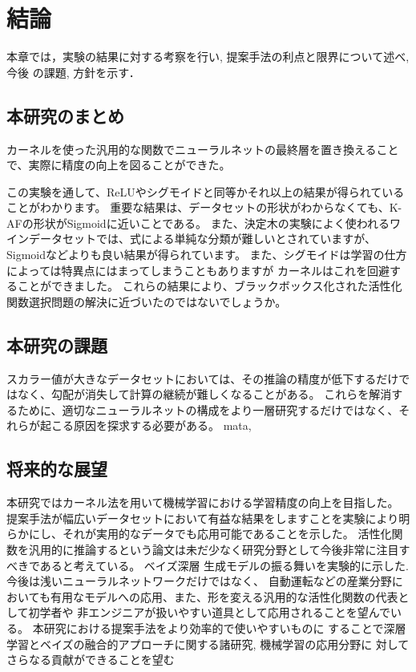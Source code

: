 \chapter{結論}
\label{conclusion}

本章では，実験の結果に対する考察を行い, 提案手法の利点と限界について述べ, 今後
の課題, 方針を示す．


\section{本研究のまとめ}

カーネルを使った汎用的な関数でニューラルネットの最終層を置き換えることで、実際に精度の向上を図ることができた。

 この実験を通して、ReLUやシグモイドと同等かそれ以上の結果が得られていることがわかります。
 重要な結果は、データセットの形状がわからなくても、K-AFの形状がSigmoidに近いことである。 
 また、決定木の実験によく使われるワインデータセットでは、式による単純な分類が難しいとされていますが、Sigmoidなどよりも良い結果が得られています。
 また、シグモイドは学習の仕方によっては特異点にはまってしまうこともありますが カーネルはこれを回避することができました。
 これらの結果により、ブラックボックス化された活性化関数選択問題の解決に近づいたのではないでしょうか。

\section{本研究の課題}
スカラー値が大きなデータセットにおいては、その推論の精度が低下するだけではなく、勾配が消失して計算の継続が難しくなることがある。
これらを解消するために、適切なニューラルネットの構成をより一層研究するだけではなく、それらが起こる原因を探求する必要がある。
mata,



\section{将来的な展望}


本研究ではカーネル法を用いて機械学習における学習精度の向上を目指した。
提案手法が幅広いデータセットにおいて有益な結果をしますことを実験により明らかにし、それが実用的なデータでも応用可能であることを示した。
活性化関数を汎用的に推論するという論文は未だ少なく研究分野として今後非常に注目すべきであると考えている。 ベイズ深層
生成モデルの振る舞いを実験的に示した. 今後は浅いニューラルネットワークだけではなく、
自動運転などの産業分野においても有用なモデルへの応用、また、形を変える汎用的な活性化関数の代表として初学者や
非エンジニアが扱いやすい道具として応用されることを望んでいる。
本研究における提案手法をより効率的で使いやすいものに
することで深層学習とベイズの融合的アプローチに関する諸研究, 機械学習の応用分野に
対してさらなる貢献ができることを望む

